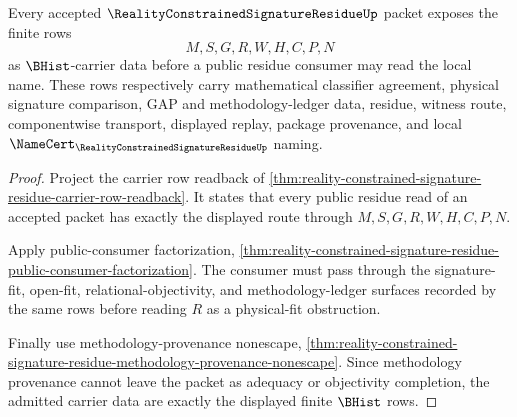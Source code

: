 \begin{theorem}
\label{thm:reality-constrained-signature-residue-carrier-admission}
Every accepted $\RealityConstrainedSignatureResidueUp$ packet exposes the finite rows
$$
M,S,G,R,W,H,C,P,N
$$
as $\BHist$-carrier data before a public residue consumer may read the local name. These rows respectively carry mathematical classifier agreement, physical signature comparison, GAP and methodology-ledger data, residue, witness route, componentwise transport, displayed replay, package provenance, and local $\NameCert_{\RealityConstrainedSignatureResidueUp}$ naming.
\end{theorem}
\begin{proof}
Project the carrier row readback of \autoref{thm:reality-constrained-signature-residue-carrier-row-readback}. It states that every public residue read of an accepted packet has exactly the displayed route through $M,S,G,R,W,H,C,P,N$.

Apply public-consumer factorization, \autoref{thm:reality-constrained-signature-residue-public-consumer-factorization}. The consumer must pass through the signature-fit, open-fit, relational-objectivity, and methodology-ledger surfaces recorded by the same rows before reading $R$ as a physical-fit obstruction.

Finally use methodology-provenance nonescape, \autoref{thm:reality-constrained-signature-residue-methodology-provenance-nonescape}. Since methodology provenance cannot leave the packet as adequacy or objectivity completion, the admitted carrier data are exactly the displayed finite $\BHist$ rows.
\end{proof}

